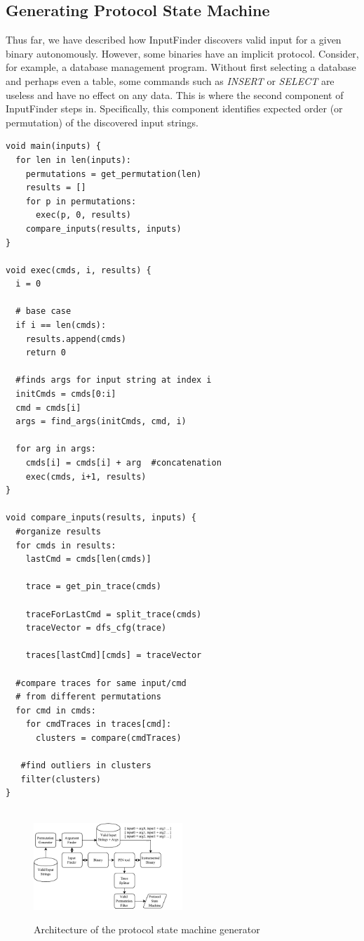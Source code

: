 \documentclass{acm_proc_article-sp}
\def \tool {InputFinder}
\begin{document}
\subsection{Generating Protocol State Machine}
Thus far, we have described how \tool{} discovers valid input for a given binary autonomously.
However, some binaries have an implicit protocol.
Consider, for example, a database management program.
Without first selecting a database and perhaps even a table, some commands such as \textit{INSERT} or \textit{SELECT} are useless and have no effect on any data.
This is where the second component of \tool{} steps in.
Specifically, this component identifies expected order (or permutation) of the discovered input strings.

\begin{lstlisting}[caption={Pseudocode implementing the protocol state machine generator},label={lst:psmcode}]
void main(inputs) {
  for len in len(inputs):
    permutations = get_permutation(len)
    results = []
    for p in permutations:
      exec(p, 0, results)
    compare_inputs(results, inputs)
}

void exec(cmds, i, results) {  
  i = 0

  # base case
  if i == len(cmds):
    results.append(cmds)
    return 0

  #finds args for input string at index i
  initCmds = cmds[0:i]
  cmd = cmds[i]
  args = find_args(initCmds, cmd, i)

  for arg in args:
    cmds[i] = cmds[i] + arg  #concatenation
    exec(cmds, i+1, results)
}
    
void compare_inputs(results, inputs) {
  #organize results
  for cmds in results:
    lastCmd = cmds[len(cmds)]
    
    trace = get_pin_trace(cmds)
    
    traceForLastCmd = split_trace(cmds)
    traceVector = dfs_cfg(trace) 
    
    traces[lastCmd][cmds] = traceVector
  
  #compare traces for same input/cmd
  # from different permutations
  for cmd in cmds:
    for cmdTraces in traces[cmd]:
      clusters = compare(cmdTraces)
   
   #find outliers in clusters
   filter(clusters)
}
		
\end{lstlisting}

\begin{figure}[h!]
\caption{Architecture of the protocol state machine generator}
\centering
\includegraphics[width=0.5\textwidth]{psmarch}
\label{fig:psm_arch}
\end{figure}
\end{document}
